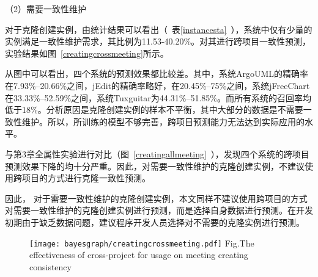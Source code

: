 （2）需要一致性维护

对于克隆创建实例，由统计结果可以看出（~表\ref{instancesta}~），系统中仅有少量的实例满足一致性维护需求，其比例为11.53-40.20\%。对其进行跨项目一致性预测，实验结果如图~\ref{creatingcrossmeeting}所示。

从图中可以看出，四个系统的预测效果都比较差。其中，系统ArgoUML的精确率在7.93\%--20.66\%之间，jEdit的精确率略好，在20.45\%--75\%之间，系统jFreeChart在33.33\%--52.59\%之间，系统Tuxguitar为44.31\%--51.85\%。而所有系统的召回率均低于18\%。分析原因是克隆创建实例的样本不平衡，其中大部分的数据是不需要一致性维护。所以，所训练的模型不够完善，跨项目预测能力无法达到实际应用的水平。

与第3章全属性实验进行对比（图~\ref{creatingallmeeting}~），发现四个系统的跨项目预测效果下降的均十分严重。因此，对需要一致性维护的克隆创建实例，不建议使用跨项目的方式进行克隆一致性预测。

因此， 对于需要一致性维护的克隆创建实例，本文同样不建议使用跨项目的方式对需要一致性维护的克隆创建实例进行预测，而是选择自身数据进行预测。在开发初期由于缺乏数据问题，建议程序开发人员选择对不需要的克隆实例进行预测。

\begin{figure}[htbp]
\centering
\texttt{[image: bayesgraph/creatingcrossmeeting.pdf]}
{Fig.$\!$}{The effectiveness of cross-project for usage on meeting creating consistency}
\vspace{-1em}
\end{figure}

